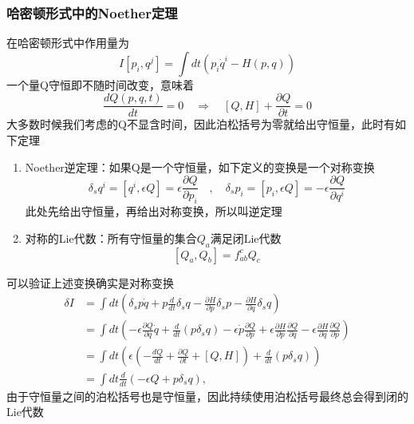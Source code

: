 \documentclass[10pt,openany]{book}
\theoremstyle{thmstyle} %
\theoremstyle{defstyle} %
\theoremstyle{prostyle} %
\begin{document}
\subsubsection{哈密顿形式中的Noether定理}
在哈密顿形式中作用量为
\begin{equation}
  I\left[p_i, q^j\right]=\int d t\left(p_i \dot{q}^i-H(p, q)\right)
\end{equation}
一个量Q守恒即不随时间改变，意味着
\begin{equation}
  \frac{d Q(p, q, t)}{d t}=0 \quad \Rightarrow \quad[Q, H]+\frac{\partial Q}{\partial t}=0
\end{equation}
大多数时候我们考虑的Q不显含时间，因此泊松括号为零就给出守恒量，此时有如下定理
\begin{enumerate}
  \item Noether逆定理：如果Q是一个守恒量，如下定义的变换是一个对称变换
  \begin{equation}
    \delta_s q^i=\left[q^i, \epsilon Q\right]=\epsilon \frac{\partial Q}{\partial p_i} \quad, \quad \delta_s p_i=\left[p_i, \epsilon Q\right]=-\epsilon \frac{\partial Q}{\partial q^i}
  \end{equation}
  此处先给出守恒量，再给出对称变换，所以叫逆定理
  \item 对称的Lie代数：所有守恒量的集合$ {Q_a} $满足闭Lie代数
  \begin{equation}
    \left[Q_a, Q_b\right]=f_{a b}^c Q_c
  \end{equation} 
\end{enumerate}
可以验证上述变换确实是对称变换
\begin{equation}
  \begin{aligned}
    \delta I & =\int d t\left(\delta_s p \dot{q}+p \frac{d}{d t} \delta_s q-\frac{\partial H}{\partial p} \delta_s p-\frac{\partial H}{\partial q} \delta_s q\right) \\
    & =\int d t\left(-\epsilon \frac{\partial Q}{\partial q} \dot{q}+\frac{d}{d t}\left(p \delta_s q\right)-\epsilon \dot{p} \frac{\partial Q}{\partial p}+\epsilon \frac{\partial H}{\partial p} \frac{\partial Q}{\partial q}-\epsilon \frac{\partial H}{\partial q} \frac{\partial Q}{\partial p}\right) \\
    & =\int d t\left(\epsilon\left(-\frac{d Q}{d t}+\frac{\partial Q}{\partial t}+[Q, H]\right)+\frac{d}{d t}\left(p \delta_s q\right)\right) \\
    & =\int d t \frac{d}{d t}\left(-\epsilon Q+p \delta_s q\right),
    \end{aligned}
\end{equation}
由于守恒量之间的泊松括号也是守恒量，因此持续使用泊松括号最终总会得到闭的Lie代数
\end{document}
